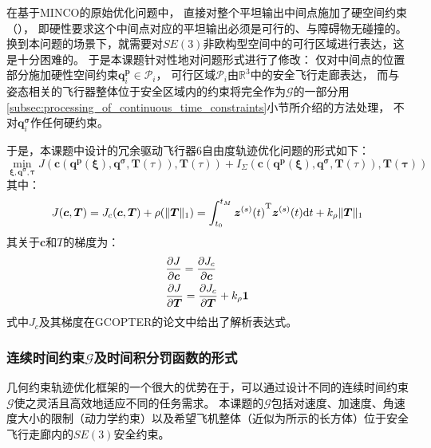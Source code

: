 在基于MINCO的原始优化问题中，
直接对整个平坦输出中间点施加了硬空间约束（），
即硬性要求这个中间点对应的平坦输出必须是可行的、与障碍物无碰撞的。
换到本问题的场景下，就需要对$SE(3)$非欧构型空间中的可行区域进行表达，这是十分困难的。
于是本课题针对性地对问题形式进行了修改：
仅对中间点的位置部分施加硬性空间约束$\bm{q}_i^{\bm{p}} \in \mathcal{P}_i$，
可行区域$\mathcal{P}_i$由$\mathbb{R}^3$中的安全飞行走廊表达，
而与姿态相关的飞行器整体位于安全区域内的约束将完全作为$\mathcal{G}$的一部分用\ref{subsec:processing_of_continuous_time_constraints}小节所介绍的方法处理，
不对$\bm{q}_i^{\bm{\sigma}}$作任何硬约束。

于是，本课题中设计的冗余驱动飞行器6自由度轨迹优化问题的形式如下：
\begin{equation}
  \min_{\bm{\xi}, \bm{q}^{\bm{\sigma}}, \bm{\tau}}
  J(\bm{c}(\bm{q}^{\bm{p}}(\bm{\xi}), \bm{q}^{\bm{\sigma}}, \bm{T}(\tau)), \bm{T}(\tau)) + 
  I_{\Sigma}(\bm{c}(\bm{q}^{\bm{p}}(\bm{\xi}), \bm{q}^{\bm{\sigma}}, \bm{T}(\tau)), \bm{T}(\bm{\tau}))
  \label{equ:form_of_6dof_trajectory_optimization_problem}
\end{equation}
其中：
\begin{equation}
  J(\bm{c}, \bm{T}) = J_c({\bm{c}, \bm{T}}) + \rho({\Vert \bm{T} \Vert_1}) =
  \int_{t_0}^{t_M} {\bm{z}^{(s)}(t)}^{\text{T}}\bm{z}^{(s)}(t) \mathrm{d}t + 
  k_{\rho}\Vert \bm{T} \Vert_1
  \label{equ:final_form_of_time_regularized_control_effort}
\end{equation}
其关于$\bm{c}$和$T$的梯度为：
\begin{align}
  &\frac{\partial{J}}{\partial{\bm{c}}} = \frac{\partial{J_c}}{\partial{\bm{c}}} \label{equ:grad_J_by_c}\\
  &\frac{\partial{J}}{\partial{\bm{T}}} = \frac{\partial{J_c}}{\partial{\bm{T}}} + k_{\rho}\textbf{1} \label{equ:grad_J_by_T}
\end{align}
式中$J_c$及其梯度在GCOPTER的论文中给出了解析表达式\cite[28]{wang2022geometrically}。

\subsubsection{连续时间约束$\mathcal{G}$及时间积分罚函数的形式}\label{subsubsec:form_of_G_and_tipf}
几何约束轨迹优化框架的一个很大的优势在于，可以通过设计不同的连续时间约束$\mathcal{G}$使之灵活且高效地适应不同的任务需求。
本课题的$\mathcal{G}$包括对速度、加速度、角速度大小的限制（动力学约束）以及希望飞机整体（近似为所示的长方体）位于安全飞行走廊内的$SE(3)$安全约束。

